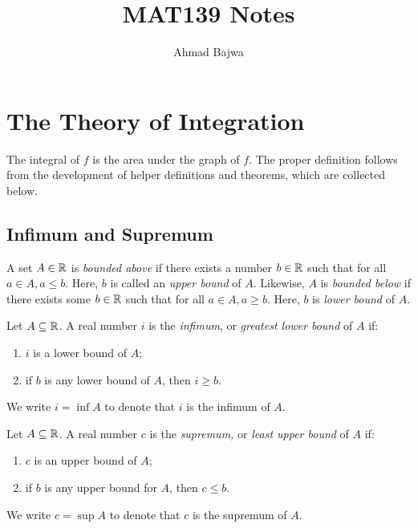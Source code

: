 \documentclass{article}
\title{MAT139 Notes}
\author{Ahmad Bajwa}
\begin{document}
\maketitle
\tableofcontents
\pagebreak


\section{The Theory of Integration}
    The integral of \(f\) is the area under the graph of \(f\). The proper definition follows from the development of helper definitions and theorems, which are collected below.

    \subsection{Infimum and Supremum}
    
    \begin{defi}[Bounds]
      A set \(A \in \mathbb{R}\) is \emph{bounded above} if there exists a number \(b \in \mathbb{R}\) such that for all \(a \in A, a \leq b\). Here, \(b\) is called an \emph{upper bound} of \(A\). Likewise, \(A\) is \emph{bounded below} if there exists some \(b \in \mathbb{R}\) such that for all \(a \in A, a \geq b\). Here, \(b\) is \emph{lower bound} of \(A\).
      \end{defi}

      \begin{defi}[Infimum]
        Let \(A \subseteq \mathbb{R}\). A real number \(i\) is the \emph{infimum}, or \emph{greatest lower bound} of \(A\) if:
        \begin{enumerate}
          \item \(i\) is a lower bound of \(A\);
          \item if \(b\) is any lower bound of \(A\), then \(i \geq b\).
        \end{enumerate}

        We write \(i = \inf A\) to denote that \(i\) is the infimum of \(A\).
      \end{defi}
      

      \begin{defi}[Supremum]
        Let \(A \subseteq \mathbb{R}\). A real number \(c\) is the \emph{supremum,} or \emph{least upper bound} of \(A\) if:
        \begin{enumerate}
          \item \(c\) is an upper bound of \(A\);
          \item if \(b\) is any upper bound for \(A\), then \(c \leq b\).
        \end{enumerate}

        We write \(c = \sup A\) to denote that \(c\) is the supremum of \(A\).
      \end{defi}
\end{document}
